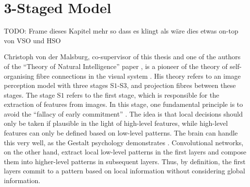 \section{3-Staged Model}
TODO: Frame dieses Kapitel mehr so dass es klingt als wäre dies etwas on-top von VSO und HSO

Christoph von der Malsburg, co-supervisor of this thesis and one of the authors of the ``Theory of Natural Intelligence'' paper , is a pioneer of the theory of self-organising fibre connections in the visual system . His theory refers to an image perception model with three stages S$1$-S$3$, and projection fibres between these stages.
The stage S$1$ refers to the first stage, which is responsible for the extraction of features from images. In this stage, one fundamental principle is to avoid the ``fallacy of early commitment'' .
The idea is that local decisions should only be taken if plausible in the light of high-level features, while high-level features can only be defined based on low-level patterns.
The brain can handle this very well, as the Gestalt psychology demonstrates .
Convolutional networks, on the other hand, extract local low-level patterns in the first layers and compose them into higher-level patterns in subsequent layers. Thus, by definition, the first layers commit to a pattern based on local information without considering global information.

